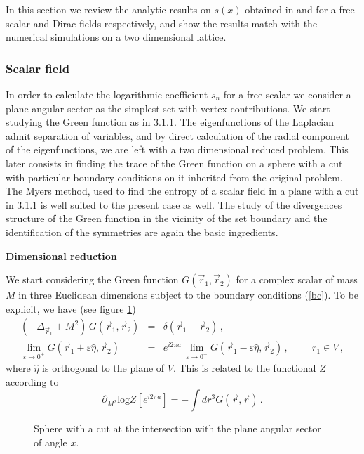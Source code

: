 \documentclass[11pt]{article}
\begin{document}
In this section we review the analytic results on $s(x)$ obtained in \cite{log} and \cite{log1} for a free scalar and Dirac fields respectively, and show the results match with the numerical simulations on a two dimensional lattice. 


\subsubsection{Scalar field}

In order to calculate the logarithmic coefficient $s_n$ for a free scalar we consider a plane angular sector as the simplest set with vertex contributions. We start studying the Green function as in 3.1.1.  The eigenfunctions of the Laplacian admit separation of variables, and by direct calculation of the radial component of the eigenfunctions, we are left with a two dimensional reduced problem. This later consists in finding the trace of the Green function on a sphere with a cut with particular boundary conditions on it inherited from the original problem. The Myers method, used to find the entropy of a scalar field in a plane with a cut in 3.1.1 is well suited to the present case as well. The study of the divergences structure of the Green function in the vicinity of the set boundary and the identification of the symmetries are again the basic ingredients. 
\smallskip

\noindent
\textbf{Dimensional reduction}

\noindent
We start considering the Green function $G(\vec{r}_1,\vec{r}_2)$ for a complex scalar of mass $M$ in three Euclidean dimensions subject to the boundary conditions (\ref{bc}). To be explicit, we have (see figure \ref{esfe})
\begin{eqnarray}
(-\Delta_{\vec{r}_1}+M^2) \,G(\vec{r}_1,\vec{r}_2)&=&\delta(\vec{r}_1-\vec{r}_2)\,,\\
\lim_{\varepsilon\rightarrow 0^+} G(\vec{r}_1+\varepsilon \hat{\eta},\vec{r}_2)&=&e^{i 2 \pi a}  \,\lim_{\varepsilon\rightarrow 0^+} G(\vec{r}_1-\varepsilon \hat{\eta},\vec{r}_2)\,, \hspace{1cm} r_1\in V\, ,\label{catorr}
\end{eqnarray} 
 where  $\hat{\eta}$ is orthogonal to the plane of $V$. This is related to the functional $Z$ according to 
\begin{equation}
\partial_{M^2}\textrm{log}Z[e^{i 2\pi a}]=-\int dr^3 G(\vec{r},\vec{r})\,.
\label{green}
\end{equation}

 \begin{figure} [tbp]
\centering
\leavevmode
\epsfxsize=6cm
\bigskip
{}
\caption{Sphere with a cut at the intersection with the plane angular sector of angle $x$.}
\label{esfe}
\end{figure}
\end{document}
